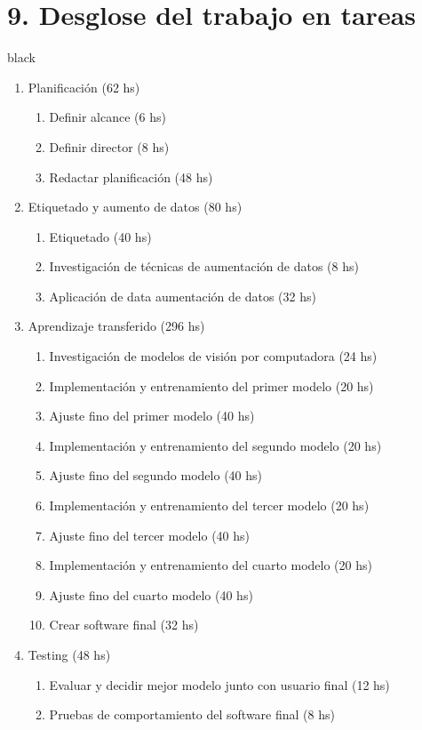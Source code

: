 \documentclass[
11pt, %
]{charter}
\begin{document}
\section{9. Desglose del trabajo en tareas}
\label{sec:wbs}
\begin{consigna}{black}
\begin{enumerate}
\item Planificación (62 hs)
	\begin{enumerate}
	\item Definir alcance (6 hs)
	\item Definir director (8 hs)
	\item Redactar planificación (48 hs)
	\end{enumerate}
\item Etiquetado y aumento de datos (80 hs)
	\begin{enumerate}
	\item Etiquetado (40 hs)
	\item Investigación de técnicas de aumentación de datos (8 hs)
	\item Aplicación de data aumentación de datos (32 hs)
	\end{enumerate}
\item Aprendizaje transferido (296 hs)
	\begin{enumerate}
	\item Investigación de modelos de visión por computadora (24 hs)
	\item Implementación y entrenamiento del primer modelo (20 hs)
	\item Ajuste fino del primer modelo (40 hs)
	\item Implementación y entrenamiento del segundo modelo (20 hs)
	\item Ajuste fino del segundo modelo (40 hs)
	\item Implementación y entrenamiento del tercer modelo (20 hs)
	\item Ajuste fino del tercer modelo (40 hs)
	\item Implementación y entrenamiento del cuarto modelo (20 hs)
	\item Ajuste fino del cuarto modelo (40 hs)
	\item Crear software final (32 hs)
	\end{enumerate}
\item Testing (48 hs)
	\begin{enumerate}
	\item Evaluar y decidir mejor modelo junto con usuario final (12 hs)
	\item Pruebas de comportamiento del software final (8 hs)

\end{enumerate}
\end{enumerate}
\end{consigna}
\end{document}
